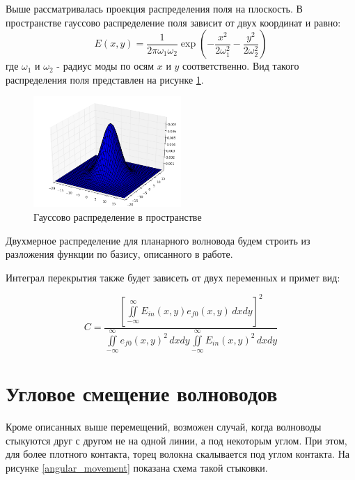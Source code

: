 Выше рассматривалась проекция распределения поля на плоскость. В пространстве гауссово распределение поля зависит от двух координат и равно:
\begin{equation}
  \label{gauss3d}
  E(x,y)=\frac{1}{2\pi\omega_1\omega_2}\exp\left(-\frac{x^2}{2\omega_1^2}-\frac{y^2}{2\omega_2^2}\right)
\end{equation}
где $\omega_1$ и $\omega_2$ - радиус моды по осям $x$ и $y$ соответственно. Вид такого распределения поля представлен на рисунке \ref{gauss3dPlot}.
\begin{figure}[h!]
	\includegraphics[width=0.5\textwidth]{img/gauss3d.png}
	\caption{Гауссово распределение в пространстве}
	\label{gauss3dPlot}
\end{figure}

Двухмерное распределение для планарного волновода будем строить из разложения функции по базису, описанного в работе\cite{vlada}.

Интеграл перекрытия также будет зависеть от двух переменных и примет вид:

\begin{equation}
	\label{coupling_2d}
	C = \frac{\left[\iint\limits_{-\infty}^{\infty}E_{in}(x,y)e_{f0}(x,y) \,dxdy\right]^2}
	{\iint\limits_{-\infty}^{\infty}e_{f0}(x,y)^2 \,dxdy
	 \iint\limits_{-\infty}^{\infty}E_{in}(x,y)^2 \,dxdy}
\end{equation}

\section{Угловое смещение волноводов}
Кроме описанных выше перемещений, возможен случай, когда волноводы стыкуются друг с другом не на одной линии, а под некоторым углом. При этом, для более плотного контакта, торец волокна скалывается под углом контакта. На рисунке \ref{angular_movement} показана схема такой стыковки.

